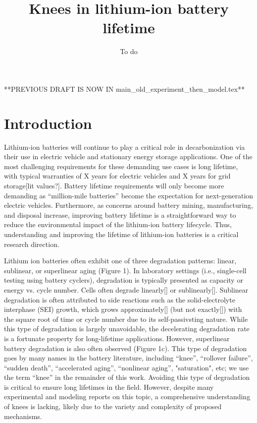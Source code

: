 \documentclass{article}
\title{Knees in lithium-ion battery lifetime}
\author{To do}
\date{}
\begin{document}
\maketitle

**PREVIOUS DRAFT IS NOW IN main\_old\_experiment\_then\_model.tex**

\section{Introduction}

Lithium-ion batteries will continue to play a critical role in decarbonization via their use in electric vehicle and stationary energy storage applications. One of the most challenging requirements for these demanding use cases is long lifetime, with typical warranties of X years for electric vehicles and X years for grid storage[lit values?]. Battery lifetime requirements will only become more demanding as “million-mile batteries” become the expectation for next-generation electric vehicles. Furthermore, as concerns around battery mining, manufacturing, and disposal increase, improving battery lifetime is a straightforward way to reduce the environmental impact of the lithium-ion battery lifecycle. Thus, understanding and improving the lifetime of lithium-ion batteries is a critical research direction.

Lithium ion batteries often exhibit one of three degradation patterns: linear, sublinear, or superlinear aging (Figure 1). In laboratory settings (i.e., single-cell testing using battery cyclers), degradation is typically presented as capacity or energy vs. cycle number. Cells often degrade linearly[] or sublinearly[]. Sublinear degradation is often attributed to side reactions such as the solid-electrolyte interphase (SEI) growth, which grows approximately[] (but not exactly[]) with the square root of time or cycle number due to its self-passivsting nature. While this type of degradation is largely unavoidable, the decelerating degradation rate is a fortunate property for long-lifetime applications. However, superlinear battery degradation is also often observed (Figure 1c). This type of degradation goes by many names in the battery literature, including “knee”, “rollover failure”, “sudden death”, “accelerated aging”, “nonlinear aging”, "saturation", etc; we use the term “knee” in the remainder of this work. Avoiding this type of degradation is critical to ensure long lifetimes in the field. However, despite many experimental and modeling reports on this topic, a comprehensive understanding of knees is lacking, likely due to the variety and complexity of proposed mechanisms.
\end{document}

